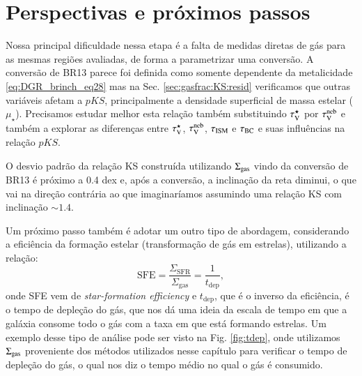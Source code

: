 \section{Perspectivas e próximos passos}
\label{sec:gasfrac:nextsteps}

Nossa principal dificuldade nessa etapa é a falta de medidas diretas de gás para as mesmas regiões
avaliadas, de forma a parametrizar uma conversão. A conversão de BR13 parece foi definida como
somente dependente da metalicidade \eqref{eq:DGR_brinch_eq28} mas na Sec. \ref{sec:gasfrac:KS:resid}
verificamos que outras variáveis afetam a $pKS$, principalmente a densidade superficial de massa
estelar ($\mu_\star$). Precisamos estudar melhor esta relação também substituindo $\tau_{\mathrm{V}}^\star$ por $\tau_{\mathrm{V}}^{\mathrm{neb}}$ e
também a explorar as diferenças entre $\tau_{\mathrm{V}}^\star$, $\tau_{\mathrm{V}}^{\mathrm{neb}}$, $\tau_{\mathrm{ISM}}$ e $\tau_{\mathrm{BC}}$ e suas influências na
relação $pKS$. 

O desvio padrão da relação KS construída utilizando $\Sigma_{\mathrm{gas}}$ vindo da conversão de
BR13 é próximo a 0.4 dex e, após a conversão, a inclinação da reta diminui, o que vai na direção
contrária ao que imaginaríamos assumindo uma relação KS com inclinação $\sim 1.4$. 

Um próximo passo também é adotar um outro tipo de abordagem, considerando a eficiência da
formação estelar (transformação de gás em estrelas), utilizando a relação:
\begin{equation}
	\mathrm{SFE} = \frac{\Sigma_{\mathrm{SFR}}}{\Sigma_{\mathrm{gas}}} = \frac{1}{t_{\mathrm{dep}}},
	\label{eq:SFE}
\end{equation}
\noindent onde SFE vem de {\em star-formation efficiency} e $t_{\mathrm{dep}}$, que é o inverso da
eficiência, é o tempo de depleção do gás, que nos dá uma ideia da escala de tempo em que a galáxia
consome todo o gás com a taxa em que está formando estrelas. Um exemplo desse tipo de análise pode
ser visto na Fig. \ref{fig:tdep}, onde utilizamos $\Sigma_{\mathrm{gas}}$ proveniente dos métodos utilizados
nesse capítulo para verificar o tempo de depleção do gás, o qual nos diz o tempo médio no qual o
gás é consumido.

